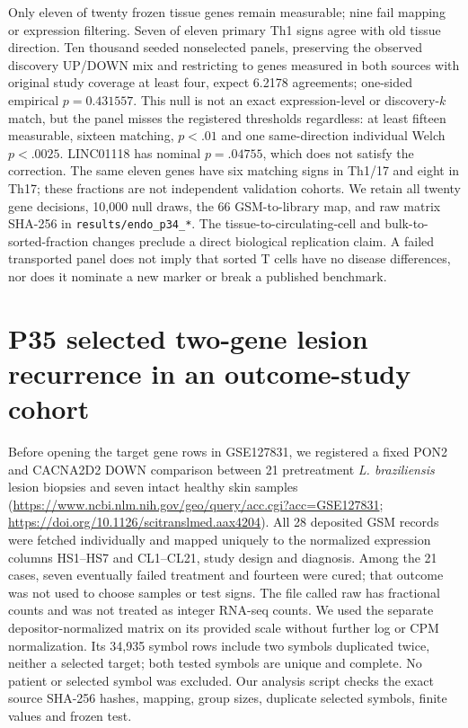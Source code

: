 \documentclass[11pt,a4paper]{article}
\begin{document}
Only eleven of twenty frozen tissue genes remain measurable; nine fail mapping or expression filtering. Seven of eleven primary Th1 signs agree with old tissue direction. Ten thousand seeded nonselected panels, preserving the observed discovery UP/DOWN mix and restricting to genes measured in both sources with original study coverage at least four, expect 6.2178 agreements; one-sided empirical $p=0.431557$. This null is not an exact expression-level or discovery-$k$ match, but the panel misses the registered thresholds regardless: at least fifteen measurable, sixteen matching, $p<.01$ and one same-direction individual Welch $p<.0025$. LINC01118 has nominal $p=.04755$, which does not satisfy the correction. The same eleven genes have six matching signs in Th1/17 and eight in Th17; these fractions are not independent validation cohorts. We retain all twenty gene decisions, 10,000 null draws, the 66 GSM-to-library map, and raw matrix SHA-256 in \texttt{results/endo\_p34\_*}. The tissue-to-circulating-cell and bulk-to-sorted-fraction changes preclude a direct biological replication claim. A failed transported panel does not imply that sorted T cells have no disease differences, nor does it nominate a new marker or break a published benchmark.

\section{P35 selected two-gene lesion recurrence in an outcome-study cohort}
Before opening the target gene rows in GSE127831, we registered a fixed PON2 and CACNA2D2 DOWN comparison between 21 pretreatment \emph{L. braziliensis} lesion biopsies and seven intact healthy skin samples (\url{https://www.ncbi.nlm.nih.gov/geo/query/acc.cgi?acc=GSE127831}; \url{https://doi.org/10.1126/scitranslmed.aax4204}). All 28 deposited GSM records were fetched individually and mapped uniquely to the normalized expression columns HS1--HS7 and CL1--CL21, study design and diagnosis. Among the 21 cases, seven eventually failed treatment and fourteen were cured; that outcome was not used to choose samples or test signs. The file called raw has fractional counts and was not treated as integer RNA-seq counts. We used the separate depositor-normalized matrix on its provided scale without further log or CPM normalization. Its 34,935 symbol rows include two symbols duplicated twice, neither a selected target; both tested symbols are unique and complete. No patient or selected symbol was excluded. Our analysis script checks the exact source SHA-256 hashes, mapping, group sizes, duplicate selected symbols, finite values and frozen test.
\end{document}
